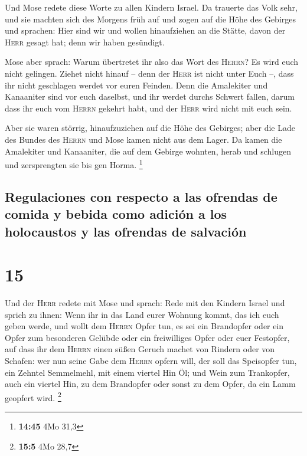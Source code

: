  Und Mose redete diese Worte zu allen Kindern Israel. Da
trauerte das Volk sehr,  und sie machten sich des Morgens
früh auf und zogen auf die Höhe des Gebirges und sprachen: Hier sind wir
und wollen hinaufziehen an die Stätte, davon der \textsc{Herr} gesagt
hat; denn wir haben gesündigt.

 Mose aber sprach: Warum übertretet ihr also das Wort des
\textsc{Herrn}? Es wird euch nicht gelingen.  Ziehet
nicht hinauf -- denn der \textsc{Herr} ist nicht unter Euch --, dass ihr
nicht geschlagen werdet vor euren Feinden.  Denn die
Amalekiter und Kanaaniter sind vor euch daselbst, und ihr werdet durchs
Schwert fallen, darum dass ihr euch vom \textsc{Herrn} gekehrt habt, und
der \textsc{Herr} wird nicht mit euch sein.

 Aber sie waren störrig, hinaufzuziehen auf die Höhe des
Gebirges; aber die Lade des Bundes des \textsc{Herrn} und Mose kamen
nicht aus dem Lager.  Da kamen die Amalekiter und
Kanaaniter, die auf dem Gebirge wohnten, herab und schlugen und
zersprengten sie bis gen Horma. \footnote{\textbf{14:45} 4Mo 31,3}

\hypertarget{regulaciones-con-respecto-a-las-ofrendas-de-comida-y-bebida-como-adiciuxf3n-a-los-holocaustos-y-las-ofrendas-de-salvaciuxf3n}{%
\subsection{Regulaciones con respecto a las ofrendas de comida y bebida
como adición a los holocaustos y las ofrendas de
salvación}\label{regulaciones-con-respecto-a-las-ofrendas-de-comida-y-bebida-como-adiciuxf3n-a-los-holocaustos-y-las-ofrendas-de-salvaciuxf3n}}

\hypertarget{section-14}{%
\section{15}\label{section-14}}

 Und der \textsc{Herr} redete mit Mose und sprach:
 Rede mit den Kindern Israel und sprich zu ihnen: Wenn ihr
in das Land eurer Wohnung kommt, das ich euch geben werde,
 und wollt dem \textsc{Herrn} Opfer tun, es sei ein
Brandopfer oder ein Opfer zum besonderen Gelübde oder ein freiwilliges
Opfer oder euer Festopfer, auf dass ihr dem \textsc{Herrn} einen süßen
Geruch machet von Rindern oder von Schafen:  wer nun seine
Gabe dem \textsc{Herrn} opfern will, der soll das Speisopfer tun, ein
Zehntel Semmelmehl, mit einem viertel Hin Öl;  und Wein
zum Trankopfer, auch ein viertel Hin, zu dem Brandopfer oder sonst zu
dem Opfer, da ein Lamm geopfert wird. \footnote{\textbf{15:5} 4Mo 28,7}

